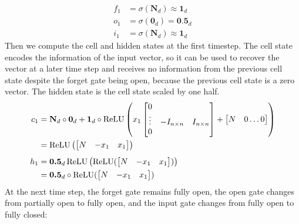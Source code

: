 %
\begin{align*}
  f_1 &= \sigma(\textbf{N}_d) \approx \textbf{1}_d \\
  o_1 &= \sigma(\textbf{0}_d) = \textbf{0.5}_d \\
  i_1 &=  \sigma(\textbf{N}_d) \approx \textbf{1}_d
\end{align*}
%
Then we compute the cell and hidden states at the first timestep. The cell state encodes the information of the input vector, so it can be used to recover the vector at a later time step and receives no information from the previous cell state despite the forget gate being open, because the previous cell state is a zero vector. The hidden state is the cell state scaled by one half.
%
\begin{align*}
  c_1 &= \textbf{N}_d\circ \textbf{0}_d+  \textbf{1}_d \circ \operatorname{ReLU}\left(x_1\begin{bmatrix} 0 &  & \\ \vdots & -I_{n \times n} & I_{n \times n}\\ 0 & &  \end{bmatrix} + \begin{bmatrix} N & 0 \dots 0\end{bmatrix}\right) \\
      & = \operatorname{ReLU}\left( \begin{bmatrix} N & -x_1 & x_1 \end{bmatrix}\right) \\[1ex]
  h_1 &= \textbf{0.5}_d\operatorname{ReLU} \left(\operatorname{ReLU}( \begin{bmatrix} N & -x_1 & x_1 \end{bmatrix})\right) \\
      &= \textbf{0.5}_d\circ \operatorname{ReLU}( \begin{bmatrix} N & -x_1 & x_1 \end{bmatrix})
\end{align*}
%
At the next time step, the forget gate remains fully open, the open gate changes from partially open to fully open, and the input gate changes from fully open to fully closed:
%
